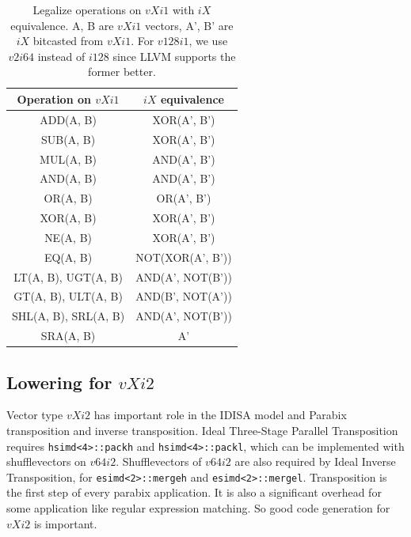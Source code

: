 \begin{table}
  \begin{center}
    \begin{tabular}{|c|c|}
      \hline
      Operation on $vXi1$ & $iX$ equivalence \\ \hline
      ADD(A, B) & XOR(A', B') \\ \hline
      SUB(A, B) & XOR(A', B') \\ \hline
      MUL(A, B) & AND(A', B') \\ \hline
      AND(A, B) & AND(A', B') \\ \hline
      OR(A, B) & OR(A', B') \\ \hline
      XOR(A, B) & XOR(A', B') \\ \hline
      NE(A, B) & XOR(A', B') \\ \hline
      EQ(A, B) & NOT(XOR(A', B')) \\\hline
      LT(A, B), UGT(A, B) & AND(A', NOT(B')) \\\hline
      GT(A, B), ULT(A, B) & AND(B', NOT(A')) \\\hline
      SHL(A, B), SRL(A, B) & AND(A', NOT(B')) \\\hline
      SRA(A, B) & A' \\\hline
    \end{tabular}
  \end{center}
\caption[Legalize operations on $vXi1$ with $iX$ equivalence.]{Legalize operations on $vXi1$ with $iX$ equivalence. A, B are $vXi1$ vectors, A', B' are $iX$ bitcasted from $vXi1$. For $v128i1$, we use $v2i64$ instead of $i128$ since LLVM supports the former better.}
\label{table:vxi1}
\end{table}

\subsection{Lowering for $vXi2$}
Vector type $vXi2$ has important role in the IDISA model and Parabix transposition and inverse transposition. Ideal Three-Stage Parallel Transposition\cite{transposition} requires \verb|hsimd<4>::packh| and \verb|hsimd<4>::packl|, which can be implemented with shufflevectors on $v64i2$. Shufflevectors of $v64i2$ are also required by Ideal Inverse Transposition, for \verb|esimd<2>::mergeh| and \verb|esimd<2>::mergel|. Transposition is the first step of every parabix application\cite{inductive_doubling_principle}. It is also a significant overhead for some application like regular expression matching\cite{rob_regex}. So good code generation for $vXi2$ is important.

